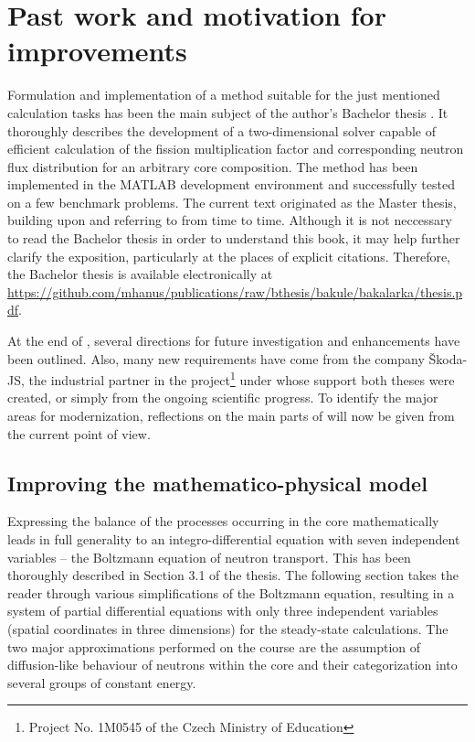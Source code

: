 \section{Past work and motivation for improvements}
Formulation and implementation of a method suitable for the just mentioned calculation tasks has been the main subject
of the author's Bachelor thesis \cite{bib:HanusBP}.
It thoroughly describes the development of a two-dimensional solver capable of efficient calculation of the fission
multiplication factor and corresponding neutron flux distribution for an arbitrary core composition. The method has been
implemented in the MATLAB development
environment and successfully tested on a few benchmark problems.
The current text originated as the Master thesis, building upon and referring to \cite{bib:HanusBP} from time to time.
Although it is not neccessary to read the Bachelor thesis in order to understand this book, it may help further clarify
the exposition, particularly at the places of explicit citations. Therefore, the Bachelor thesis is available
electronically at \url{https://github.com/mhanus/publications/raw/bthesis/bakule/bakalarka/thesis.pdf}.

At the end of \cite{bib:HanusBP}, several directions for future investigation and enhancements have been outlined. Also,
many new requirements  have come from the company {\v S}koda-JS, the industrial
partner in the project\footnote{Project No. 1M0545 of the Czech Ministry of Education} under whose support both theses
were created, or simply from the ongoing scientific progress.
To identify the major areas for modernization, reflections on the main parts of \cite{bib:HanusBP} will now be given
from the current point of view.

\subsection{Improving the mathematico-physical model} 
Expressing the balance of the processes occurring in the core mathematically leads in full generality to an
integro-differential equation with seven independent variables -- the Boltzmann equation of neutron transport. This has
been thoroughly described in Section 3.1 of the thesis. The following section takes the reader through various
simplifications of the Boltzmann equation, resulting in a system of partial differential equations with only three
independent variables (spatial coordinates in three dimensions) for the steady-state calculations. The two major
approximations performed on the course are the assumption of diffusion-like behaviour of neutrons within the core and
their categorization into several groups of constant energy.


